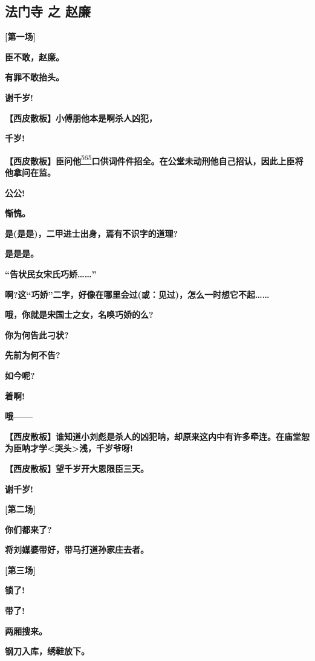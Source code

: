 \hypertarget{ux6cd5ux95e8ux5bfa-ux4e4b-ux8d75ux5ec9}{%
\subsection{法门寺 之
赵廉}\label{ux6cd5ux95e8ux5bfa-ux4e4b-ux8d75ux5ec9}}

\textbf{{[}第一场{]}}

\textbf{臣不敢，赵廉。}

\textbf{有罪不敢抬头。}

\textbf{谢千岁!}

\textbf{【西皮散板】小傅朋他本是啊杀人凶犯，}

\textbf{千岁!}

\textbf{【西皮散板】臣问他}\protect\hyperlink{fn565}{\textsuperscript{565}}\textbf{口供词件件招全。在公堂未动刑他自己招认，因此上臣将他拿问在监。}

\textbf{公公!}

\textbf{惭愧。}

\textbf{是(是是)，二甲进士出身，焉有不识字的道理?}

\textbf{是是是。}

\textbf{``告状民女宋氏巧娇\ldots{}\ldots{}''}

\textbf{啊?这``巧娇''二字，好像在哪里会过(或：见过)，怎么一时想它不起\ldots{}\ldots{}}

\textbf{哦，你就是宋国士之女，名唤巧娇的么?}

\textbf{你为何告此刁状?}

\textbf{先前为何不告?}

\textbf{如今呢?}

\textbf{着啊!}

\textbf{哦------}

\textbf{【西皮散板】谁知道小刘彪是杀人的凶犯呐，却原来这内中有许多牵连。在庙堂恕为臣呐才学\textless{}哭头\textgreater{}浅，千岁爷呀!}

\textbf{【西皮散板】望千岁开大恩限臣三天。}

\textbf{谢千岁!}

\textbf{{[}第二场{]}}

\textbf{你们都来了?}

\textbf{将刘媒婆带好，带马打道孙家庄去者。}

\textbf{{[}第三场{]}}

\textbf{锁了!}

\textbf{带了!}

\textbf{两厢搜来。}

\textbf{钢刀入库，绣鞋放下。}

